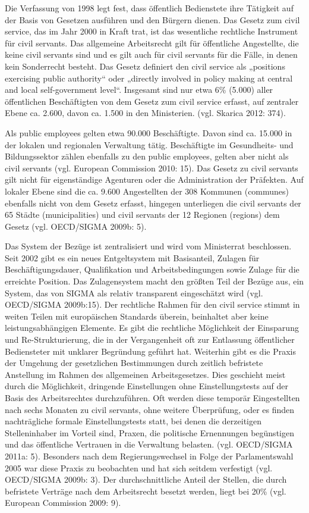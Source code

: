 Die Verfassung von 1998 legt fest, dass öffentlich Bedienstete ihre Tätigkeit auf der Basis von Gesetzen ausführen und den Bürgern dienen. Das Gesetz zum civil service, das im Jahr 2000 in Kraft trat, ist das wesentliche rechtliche Instrument für civil servants. Das allgemeine Arbeitsrecht gilt für öffentliche Angestellte, die keine civil servants sind und es gilt auch für civil servants für die Fälle, in denen kein Sonderrecht besteht. Das Gesetz definiert den civil service als „positions exercising public authority“ oder „directly involved in policy making at central and local self-government level“. Insgesamt sind nur etwa 6\% (5.000) aller öffentlichen Beschäftigten von dem Gesetz zum civil service erfasst, auf zentraler Ebene ca. 2.600, davon ca. 1.500 in den Ministerien. (vgl. Skarica 2012: 374).\par
Als public employees gelten etwa 90.000 Beschäftigte. Davon sind ca. 15.000 in der lokalen und regionalen Verwaltung tätig. Beschäftigte im Gesundheits- und Bildungssektor zählen ebenfalls zu den public employees, gelten aber nicht als civil servants (vgl. European Commission 2010: 15). Das Gesetz zu civil servants gilt nicht für eigenständige Agenturen oder die Administration der Präfekten. Auf lokaler Ebene sind die ca. 9.600 Angestellten der 308 Kommunen (communes) ebenfalls nicht von dem Gesetz erfasst, hingegen unterliegen die civil servants der 65 Städte (municipalities) und civil servants der 12 Regionen (regions) dem Gesetz (vgl. OECD/SIGMA 2009b: 5).\par
Das System der Bezüge ist zentralisiert und wird vom Ministerrat beschlossen. Seit 2002 gibt es ein neues Entgeltsystem mit Basisanteil, Zulagen für Beschäftigungsdauer, Qualifikation und Arbeitsbedingungen sowie Zulage für die erreichte Position. Das Zulagensystem macht den größten Teil der Bezüge aus, ein System, das von SIGMA als relativ transparent eingeschätzt wird (vgl. OECD/SIGMA 2009b:15). Der rechtliche Rahmen für den civil service stimmt in weiten Teilen mit europäischen Standards überein, beinhaltet aber keine leistungsabhängigen Elemente. Es gibt die rechtliche Möglichkeit der Einsparung und Re-Strukturierung, die in der Vergangenheit oft zur Entlassung öffentlicher Bediensteter mit unklarer Begründung geführt hat. Weiterhin gibt es die Praxis der Umgehung der gesetzlichen Bestimmungen durch zeitlich befristete Anstellung im Rahmen des allgemeinen Arbeitsgesetzes. Dies geschieht meist durch die Möglichkeit, dringende Einstellungen ohne Einstellungstests auf der Basis des Arbeitsrechtes durchzuführen. Oft werden diese temporär Eingestellten nach sechs Monaten zu civil servants, ohne weitere Überprüfung, oder es finden nachträgliche formale Einstellungstests statt, bei denen die derzeitigen Stelleninhaber im Vorteil sind, Praxen, die politische Ernennungen begünstigen und das öffentliche Vertrauen in die Verwaltung belasten. (vgl. OECD/SIGMA 2011a: 5). Besonders nach dem Regierungswechsel in Folge der Parlamentswahl 2005 war diese Praxis zu beobachten und hat sich seitdem verfestigt (vgl. OECD/SIGMA 2009b: 3). Der durchschnittliche Anteil der Stellen, die durch befristete Verträge nach dem Arbeitsrecht besetzt werden, liegt bei 20\% (vgl. European Commission 2009: 9).\par
